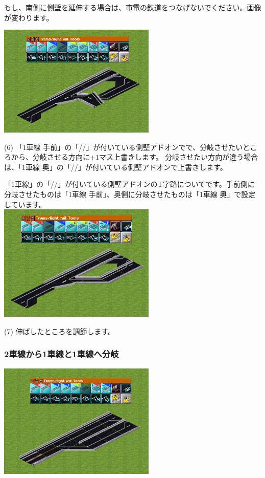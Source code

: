 \documentclass{jarticle}
\begin{document}
\begin{multicols}{2}
もし、南側に側壁を延伸する場合は、市電の鉄道をつなげないでください。画像が変わります。


\includegraphics[width = 75mm]{picture/20210214-road-2-6.png}

(6)
「1車線 手前」の「//」が付いている側壁アドオンでで、分岐させたいところから、分岐させる方向に$+1$マス上書きします。
分岐させたい方向が違う場合は、「1車線 奥」の「//」が付いている側壁アドオンで上書きします。

「1車線」の「//」が付いている側壁アドオンのT字路についてです。手前側に分岐させたものは「1車線 手前」、奥側に分岐させたものは「1車線 奥」で設定しています。\\



\includegraphics[width = 75mm]{picture/20210214-road-2-8.png}

(7)
伸ばしたところを調節します。\\

\end{multicols}


\newpage

\subsubsection{2車線から1車線と1車線へ分岐}
\label{sub:2lane_to_1lane+1lane}

\includegraphics[width = 75mm]{picture/20210214-road-3-6.png}
\vspace{10pt}
\end{document}
